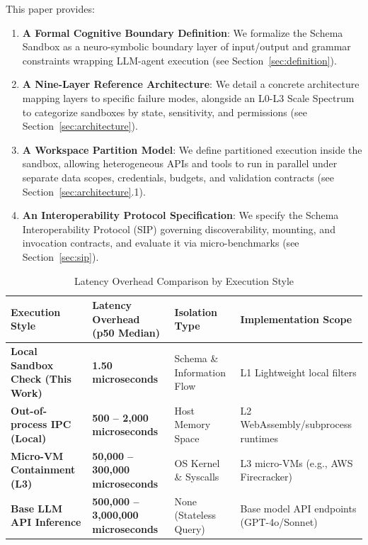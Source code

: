 \documentclass[10pt,journal,compsoc]{IEEEtran}
\begin{document}
This paper provides:
\begin{enumerate}
  \item \textbf{A Formal Cognitive Boundary Definition}: We formalize the Schema Sandbox as a neuro-symbolic boundary layer of input/output and grammar constraints wrapping LLM-agent execution (see Section~\ref{sec:definition}).
  \item \textbf{A Nine-Layer Reference Architecture}: We detail a concrete architecture mapping layers to specific failure modes, alongside an L0-L3 Scale Spectrum to categorize sandboxes by state, sensitivity, and permissions (see Section~\ref{sec:architecture}).
  \item \textbf{A Workspace Partition Model}: We define partitioned execution inside the sandbox, allowing heterogeneous APIs and tools to run in parallel under separate data scopes, credentials, budgets, and validation contracts (see Section~\ref{sec:architecture}.1).
  \item \textbf{An Interoperability Protocol Specification}: We specify the Schema Interoperability Protocol (SIP) governing discoverability, mounting, and invocation contracts, and evaluate it via micro-benchmarks (see Section~\ref{sec:sip}).
\end{enumerate}




\begin{table}[t]
\caption{Latency Overhead Comparison by Execution Style}
\label{tab:latency}
\centering
\begin{tabular}{L{4.2cm}L{3.5cm}L{4.2cm}L{5.6cm}}
\toprule
\textbf{Execution Style} & \textbf{Latency Overhead (p50 Median)} & \textbf{Isolation Type} & \textbf{Implementation Scope} \\
\midrule
\textbf{Local Sandbox Check (This Work)} & \textbf{1.50 microseconds} & Schema \& Information Flow & L1 Lightweight local filters \\
\textbf{Out-of-process IPC (Local)} & \textbf{500 -- 2,000 microseconds} & Host Memory Space & L2 WebAssembly/subprocess runtimes \\
\textbf{Micro-VM Containment (L3)} & \textbf{50,000 -- 300,000 microseconds} & OS Kernel \& Syscalls & L3 micro-VMs (e.g., AWS Firecracker) \\
\textbf{Base LLM API Inference} & \textbf{500,000 -- 3,000,000 microseconds} & None (Stateless Query) & Base model API endpoints (GPT-4o/Sonnet) \\
\bottomrule
\end{tabular}
\end{table}
\end{document}
